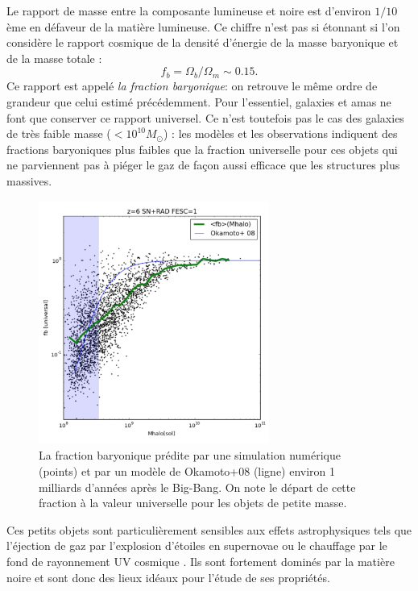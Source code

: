 Le rapport de masse entre la composante lumineuse et noire est d'environ $1/10$ème en défaveur de la matière lumineuse. Ce chiffre n'est pas si étonnant si l'on considère le rapport cosmique de la densité d'énergie de la masse baryonique et de la masse totale :
\begin{equation}
f_b=\Omega_b/\Omega_m\sim0.15.
\end{equation}
Ce rapport est appelé \textit{la fraction baryonique}: on retrouve le même ordre de grandeur que celui estimé précédemment. Pour l'essentiel, galaxies et amas ne font que conserver ce rapport universel. Ce n'est toutefois pas le cas des galaxies de très faible masse ($<10^{10} M_\odot$) : les modèles et les observations indiquent des fractions baryoniques plus faibles que la fraction universelle pour ces objets qui ne parviennent pas à piéger le gaz de façon aussi efficace que les structures plus massives. 
\begin{figure}[htbp]
	\centering
		\includegraphics[height=8cm]{figs/fbar.png}
	\caption{La fraction baryonique prédite par une simulation numérique (points) et par un modèle de Okamoto+08 (ligne) environ 1 milliards d'années après le Big-Bang. On note le départ de cette fraction à la valeur universelle pour les objets de petite masse.} 
	\label{f:fbar}
\end{figure}

Ces petits objets sont particulièrement sensibles aux effets astrophysiques tels que l'éjection de gaz par l'explosion d'étoiles en supernovae ou le chauffage par le fond de rayonnement UV cosmique . Ils sont fortement dominés par la matière noire et sont donc des lieux idéaux pour l'étude de ses propriétés.
